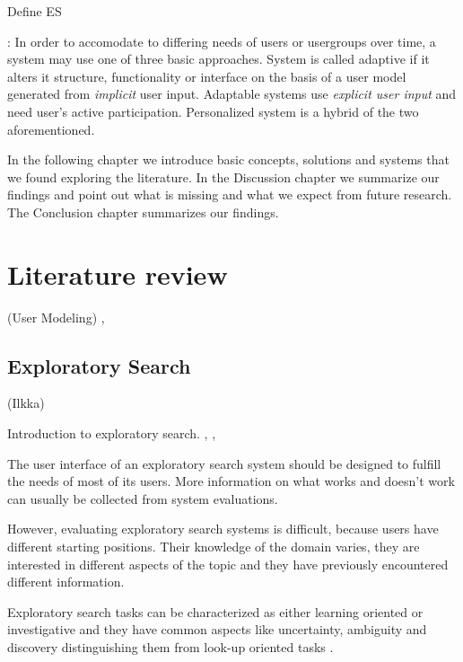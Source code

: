 \documentclass{sigchi}
\begin{document}
Define ES

\cite{van08}: 
In order to accomodate to differing needs of users or usergroups over time, a system may use one of three basic approaches. System is called adaptive if it alters it structure, functionality or interface on the basis of a user model generated from \textit{implicit} user input. Adaptable systems use \textit{explicit user input} and need user's active participation. Personalized system is a hybrid of the two aforementioned.

In the following chapter we introduce basic concepts, solutions and systems that we found exploring the literature. 
In the Discussion chapter we summarize our findings and point out what is missing and what we expect from future research. 
The Conclusion chapter summarizes our findings.


\section{Literature review}
\label{sec:litreview}

(User Modeling) \cite{rich99}, \cite{fischer01}

\subsection{Exploratory Search}
(Ilkka)

Introduction to exploratory search.
\cite{march06}, \cite{white09}, \cite{tvaro11}



The user interface of an exploratory search system should be designed to fulfill the needs of most of its users. More information on what works and doesn't work can usually be collected from system evaluations.

However, evaluating exploratory search systems is difficult, because users have different starting positions. Their knowledge of the domain varies, they are interested in different aspects of the topic and they have previously encountered different information. \cite{kules08}

Exploratory search tasks can be characterized as either learning oriented or investigative  and they have common aspects like uncertainty, ambiguity and discovery distinguishing them from look-up oriented tasks \cite{kules09}.
\end{document}
